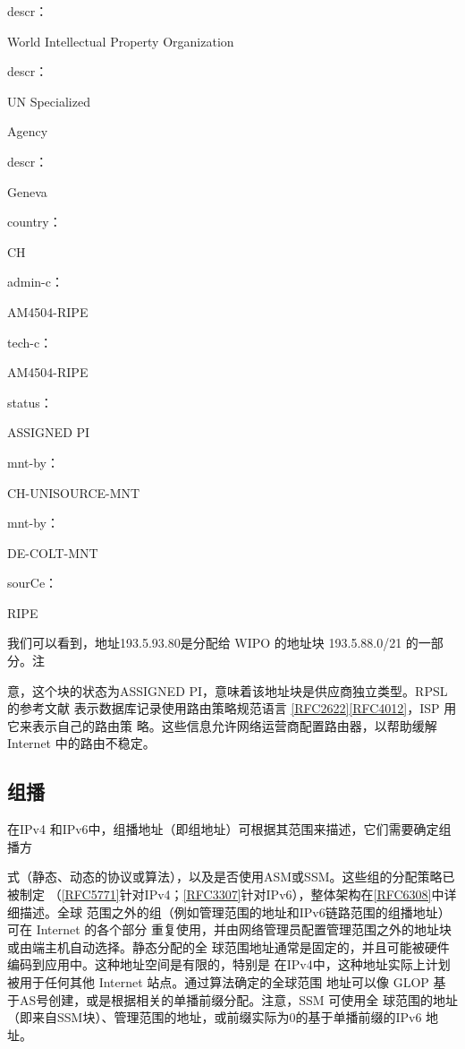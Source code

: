 descr：

World Intellectual Property Organization

descr：

UN Specialized

Agency

descr：

Geneva

country：

CH

admin-c：

AM4504-RIPE

tech-c：

AM4504-RIPE

status：

ASSIGNED PI

mnt-by：

CH-UNISOURCE-MNT

mnt-by：

DE-COLT-MNT

sourCe：

RIPE

我们可以看到，地址193.5.93.80是分配给 WIPO 的地址块 193.5.88.0/21 的一部分。注

意，这个块的状态为ASSIGNED PI，意味着该地址块是供应商独立类型。RPSL 的参考文献
表示数据库记录使用路由策略规范语言 \href{https://www.rfc-editor.org/rfc/rfc2622}{[RFC2622]}\href{https://www.rfc-editor.org/rfc/rfc4012}{[RFC4012]}，ISP 用它来表示自己的路由策
略。这些信息允许网络运营商配置路由器，以帮助缓解 Internet 中的路由不稳定。

\subsection{组播}
在IPv4 和IPv6中，组播地址（即组地址）可根据其范围来描述，它们需要确定组播方

式（静态、动态的协议或算法），以及是否使用ASM或SSM。这些组的分配策略已被制定
（\href{https://www.rfc-editor.org/rfc/rfc5771}{[RFC5771]}针对IPv4；\href{https://www.rfc-editor.org/rfc/rfc3307}{[RFC3307]}针对IPv6），整体架构在\href{https://www.rfc-editor.org/rfc/rfc6308}{[RFC6308]}中详细描述。全球
范围之外的组（例如管理范围的地址和IPv6链路范围的组播地址）可在 Internet 的各个部分
重复使用，并由网络管理员配置管理范围之外的地址块或由端主机自动选择。静态分配的全
球范围地址通常是固定的，并且可能被硬件编码到应用中。这种地址空间是有限的，特别是
在IPv4中，这种地址实际上计划被用于任何其他 Internet 站点。通过算法确定的全球范围
地址可以像 GLOP 基于AS号创建，或是根据相关的单播前缀分配。注意，SSM 可使用全
球范围的地址（即来自SSM块）、管理范围的地址，或前缀实际为0的基于单播前缀的IPv6
地址。

